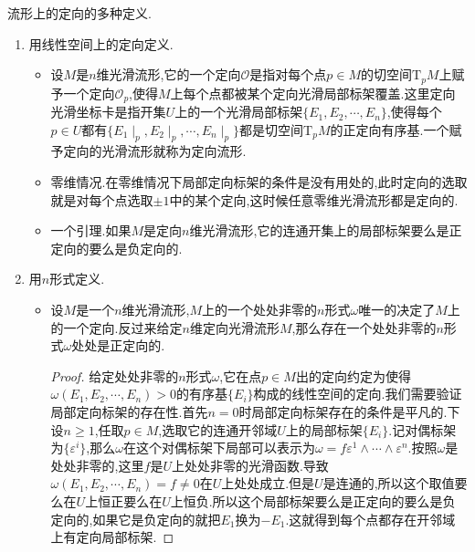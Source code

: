 流形上的定向的多种定义.
\begin{enumerate}
	\item 用线性空间上的定向定义.
	\begin{itemize}
		\item 设$M$是$n$维光滑流形,它的一个定向$\mathscr{O}$是指对每个点$p\in M$的切空间$\mathrm{T}_pM$上赋予一个定向$\mathscr{O}_p$,使得$M$上每个点都被某个定向光滑局部标架覆盖.这里定向光滑坐标卡是指开集$U$上的一个光滑局部标架$\{E_1,E_2,\cdots,E_n\}$,使得每个$p\in U$都有$\{E_1\mid_p,E_2\mid_p,\cdots,E_n\mid_p\}$都是切空间$\mathrm{T}_pM$的正定向有序基.一个赋予定向的光滑流形就称为定向流形.
		\item 零维情况.在零维情况下局部定向标架的条件是没有用处的,此时定向的选取就是对每个点选取$\pm1$中的某个定向,这时候任意零维光滑流形都是定向的.
		\item 一个引理.如果$M$是定向$n$维光滑流形,它的连通开集上的局部标架要么是正定向的要么是负定向的.
	\end{itemize}
    \item 用$n$形式定义.
    \begin{itemize}
    	\item 设$M$是一个$n$维光滑流形,$M$上的一个处处非零的$n$形式$\omega$唯一的决定了$M$上的一个定向.反过来给定$n$维定向光滑流形$M$,那么存在一个处处非零的$n$形式$\omega$处处是正定向的.
    	\begin{proof}
    		
    		给定处处非零的$n$形式$\omega$,它在点$p\in M$出的定向约定为使得$\omega(E_1,E_2,\cdots,E_n)>0$的有序基$\{E_i\}$构成的线性空间的定向.我们需要验证局部定向标架的存在性.首先$n=0$时局部定向标架存在的条件是平凡的.下设$n\ge1$,任取$p\in M$,选取它的连通开邻域$U$上的局部标架$\{E_i\}$.记对偶标架为$\{\varepsilon^i\}$,那么$\omega$在这个对偶标架下局部可以表示为$\omega=f\varepsilon^1\wedge\cdots\wedge\varepsilon^n$.按照$\omega$是处处非零的,这里$f$是$U$上处处非零的光滑函数.导致$\omega(E_1,E_2,\cdots,E_n)=f\not=0$在$U$上处处成立.但是$U$是连通的,所以这个取值要么在$U$上恒正要么在$U$上恒负.所以这个局部标架要么是正定向的要么是负定向的,如果它是负定向的就把$E_1$换为$-E_1$.这就得到每个点都存在开邻域上有定向局部标架.
    		

\end{proof}
\end{itemize}
\end{enumerate}
